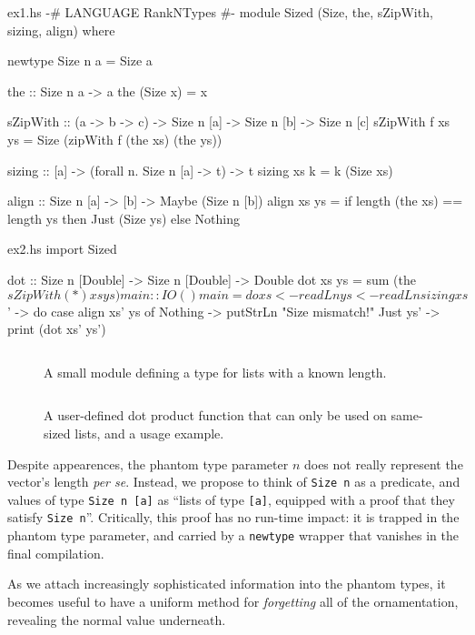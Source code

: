 \documentclass[format=sigplan, review=false, screen=true]{acmart}
\begin{document}
\begin{filecontents*}{ex1.hs}  
{-# LANGUAGE RankNTypes #-}
module Sized
  (Size, the, sZipWith, sizing, align) where

newtype Size n a = Size a

the :: Size n a -> a
the (Size x) = x

sZipWith :: (a -> b -> c)
         -> Size n [a]
         -> Size n [b]
         -> Size n [c]
sZipWith f xs ys =
  Size (zipWith f (the xs) (the ys))
  
sizing :: [a] -> (forall n. Size n [a] -> t) -> t
sizing xs k = k (Size xs)

align :: Size n [a] -> [b] -> Maybe (Size n [b])
align xs ys = if length (the xs) == length ys
              then Just (Size ys)
              else Nothing

\end{filecontents*}

\begin{filecontents*}{ex2.hs}
import Sized

dot :: Size n [Double] -> Size n [Double] -> Double
dot xs ys = sum (the $ sZipWith (*) xs ys)

main :: IO ()
main = do
  xs <- readLn
  ys <- readLn
  sizing xs $ \xs' -> do
    case align xs' ys of
      Nothing  -> putStrLn "Size mismatch!"
      Just ys' -> print (dot xs' ys')
\end{filecontents*}

\begin{figure}
    \inputminted{haskell}{ex1.hs}
  \caption{A small module defining a type for lists with a known length.}
\end{figure}
\begin{figure}
    \inputminted{haskell}{ex2.hs}
    \caption{A user-defined dot product function that can only be used on same-sized lists,
    and a usage example. \label{dot-product}}
\end{figure}

Despite  appearences, the phantom type parameter $n$ does not really represent the vector's length
{\em per se}. Instead, we propose to think of \texttt{Size n} as a predicate, and values of
type \texttt{Size n [a]} as ``lists of type \texttt{[a]}, equipped with a proof
that they satisfy \texttt{Size n}''. Critically, this proof has no run-time impact: it is trapped in the phantom type parameter, and carried by a \texttt{newtype} wrapper that vanishes in
the final compilation.


As we attach increasingly sophisticated information into the phantom types, it becomes useful to
have a uniform method for \emph{forgetting} all of the ornamentation, revealing the normal
value underneath.
\end{document}
